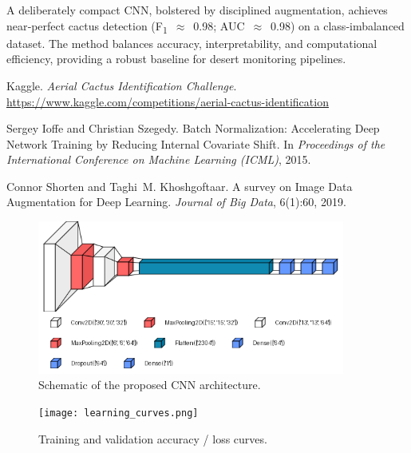 \documentclass[11pt,a4paper]{article}
\begin{document}
A deliberately compact CNN, bolstered by disciplined augmentation, achieves near‐perfect cactus detection (F\textsubscript{1}~$\approx$~0.98; AUC~$\approx$~0.98) on a class‐imbalanced dataset.  
The method balances accuracy, interpretability, and computational efficiency, providing a robust baseline for desert monitoring pipelines.

\begin{thebibliography}{9}

Kaggle. \emph{Aerial Cactus Identification Challenge}.  
\url{https://www.kaggle.com/competitions/aerial-cactus-identification}

Sergey Ioffe and Christian Szegedy.  
\newblock Batch Normalization: Accelerating Deep Network Training by Reducing Internal Covariate Shift.  
\newblock In \emph{Proceedings of the International Conference on Machine Learning (ICML)}, 2015.

Connor Shorten and Taghi~M. Khoshgoftaar.  
\newblock A survey on Image Data Augmentation for Deep Learning.  
\newblock \emph{Journal of Big Data}, 6(1):60, 2019.

\end{thebibliography}

\begin{figure}[p]
  \centering
  \includegraphics[width=0.9\textwidth]{cnn_architecture.png}
  \caption{Schematic of the proposed CNN architecture.}
  \label{fig:architecture}
\end{figure}

\begin{figure}[p]
  \centering
  \texttt{[image: learning\_curves.png]}
  \caption{Training and validation accuracy / loss curves.}
  \label{fig:learning}
\end{figure}
\end{document}
